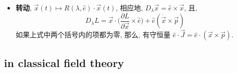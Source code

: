 \begin{itemize}
\begin{itemize}
		\item \textbf{转动}, $\vec{x}(t) \mapsto R(\lambda, \hat{e}) \cdot \vec{x}(t)$, 相应地, $D_\lambda \vec{x} = \hat{e} \times \vec{x}$, 且,
		\begin{equation}
			D_\lambda L = \vec{x} \cdot \Big( \frac{\partial L}{\partial \vec{x}} \times \hat{e} \Big) + \hat{e} (\dot{\vec{x}} \times \vec{p})
		\end{equation}
		如果上式中两个括号内的项都为零, 那么, 有守恒量 $\hat{e} \cdot \vec{J} = \hat{e} \cdot (\vec{x} \times \vec{p})$.
	\end{itemize}
\end{itemize}

\subsection{in classical field theory}
